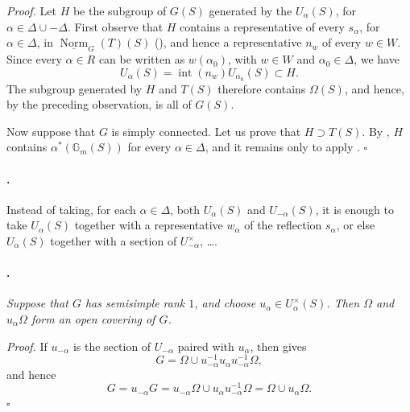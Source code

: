 \textit{Proof.}
Let \(H\) be the subgroup of \(G(S)\) generated by the
\(U_\alpha(S)\), for \(\alpha\in\Delta\cup-\Delta\). First observe
that \(H\) contains a representative of every \(s_\alpha\), for
\(\alpha\in\Delta\), in
\(\underline{\operatorname{Norm}}_G(T)(S)\) \textup{()}, and hence a representative \(n_w\) of every \(w\in W\).
Since every \(\alpha\in R\) can be written as \(w(\alpha_0)\), with
\(w\in W\) and \(\alpha_0\in\Delta\), we have
\[
  U_\alpha(S)
  =
  \operatorname{int}(n_w)U_{\alpha_0}(S)
  \subset H.
\]
The subgroup generated by \(H\) and \(T(S)\) therefore contains
\(\Omega(S)\), and hence, by the preceding observation, is all of
\(G(S)\).

Now suppose that \(G\) is simply connected. Let us prove that
\(H\supset T(S)\). By , \(H\) contains
\(\alpha^*(\mathbb G_m(S))\) for every \(\alpha\in\Delta\), and it
remains only to apply .
\hfill\(\square\)

\paragraph{.}
Instead of taking, for each \(\alpha\in\Delta\), both \(U_\alpha(S)\)
and \(U_{-\alpha}(S)\), it is enough to take \(U_\alpha(S)\) together
with a representative \(w_\alpha\) of the reflection \(s_\alpha\), or
else \(U_\alpha(S)\) together with a section of
\(U_{-\alpha}^{\times}\), \ldots.

\paragraph{.}
\textit{Suppose that \(G\) has semisimple rank \(1\), and choose
\(u_\alpha\in U_\alpha^\times(S)\). Then \(\Omega\) and
\(u_\alpha\Omega\) form an open covering of \(G\).}

\textit{Proof.}
If \(u_{-\alpha}\) is the section of \(U_{-\alpha}\) paired with
\(u_\alpha\), then  \textup{} gives
\[
  G
  =
  \Omega\cup
  u_{-\alpha}^{-1}u_\alpha u_{-\alpha}^{-1}\Omega,
\]
and hence
\[
  G
  =
  u_{-\alpha}G
  =
  u_{-\alpha}\Omega\cup
  u_\alpha u_{-\alpha}^{-1}\Omega
  =
  \Omega\cup u_\alpha\Omega.
\]
\hfill\(\square\)

